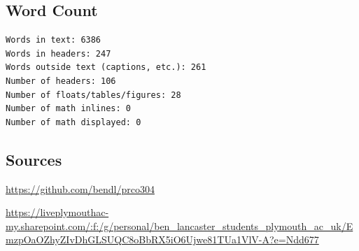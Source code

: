 \documentclass[11pt,a4paper]{report}
\begin{document}
\newpage
\renewcommand*\contentsname{Table of Contents}

{\hypersetup{linkcolor=black}
\tableofcontents
\listoffigures
\listoftables}
\newpage
 
\subsection*{Word Count}
\begin{verbatim}
Words in text: 6386
Words in headers: 247
Words outside text (captions, etc.): 261
Number of headers: 106
Number of floats/tables/figures: 28
Number of math inlines: 0
Number of math displayed: 0
\end{verbatim}

\subsection*{Sources}
\begin{description}[style=nextline]
\item[GitHub (with git repository metadata)]{\url{https://github.com/bendl/prco304}}
\item[OneDrive (raw files)]{\url{https://liveplymouthac-my.sharepoint.com/:f:/g/personal/ben_lancaster_students_plymouth_ac_uk/EmzpOaOZhyZIvDhGLSUQC8oBbRX5iO6Ujwe81TUa1VlV-A?e=Ndd677}}
\end{description}
\end{document}
